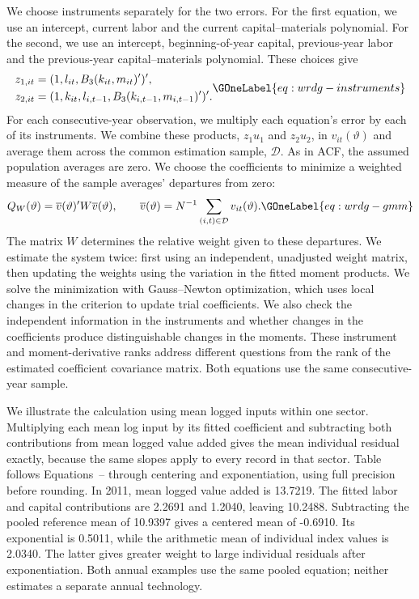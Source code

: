 We choose instruments separately for the two errors. For the first equation, we use an intercept, current labor and the current capital--materials polynomial. For the second, we use an intercept, beginning-of-year capital, previous-year labor and the previous-year capital--materials polynomial. These choices give
\begin{equation}
\begin{aligned}
z_{1,it}&=(1,l_{it},B_3(k_{it},m_{it})')',\\
z_{2,it}&=(1,k_{it},l_{i,t-1},B_3(k_{i,t-1},m_{i,t-1})')'.
\end{aligned}
\GOneLabel{eq:wrdg-instruments}
\end{equation}
For each consecutive-year observation, we multiply each equation's error by each of its instruments. We combine these products, $z_1u_1$ and $z_2u_2$, in $v_{it}(\vartheta)$ and average them across the common estimation sample, $\mathcal D$. As in ACF, the assumed population averages are zero. We choose the coefficients to minimize a weighted measure of the sample averages' departures from zero:
\begin{equation}
Q_W(\vartheta)=\overline v(\vartheta)'W\overline v(\vartheta),\qquad
\overline v(\vartheta)=N^{-1}\sum_{(i,t)\in\mathcal D}v_{it}(\vartheta).
\GOneLabel{eq:wrdg-gmm}
\end{equation}
The matrix $W$ determines the relative weight given to these departures. We estimate the system twice: first using an independent, unadjusted weight matrix, then updating the weights using the variation in the fitted moment products. We solve the minimization with Gauss--Newton optimization, which uses local changes in the criterion to update trial coefficients. We also check the independent information in the instruments and whether changes in the coefficients produce distinguishable changes in the moments. These instrument and moment-derivative ranks address different questions from the rank of the estimated coefficient covariance matrix. Both equations use the same consecutive-year sample.

We illustrate the calculation using mean logged inputs within one sector. Multiplying each mean log input by its fitted coefficient and subtracting both contributions from mean logged value added gives the mean individual residual exactly, because the same slopes apply to every record in that sector. Table~ follows Equations~-- through centering and exponentiation, using full precision before rounding.
In 2011, mean logged value added is 13.7219. The fitted labor and capital contributions are 2.2691 and 1.2040, leaving 10.2488. Subtracting the pooled reference mean of 10.9397 gives a centered mean of -0.6910. Its exponential is 0.5011, while the arithmetic mean of individual index values is 2.0340. The latter gives greater weight to large individual residuals after exponentiation. Both annual examples use the same pooled equation; neither estimates a separate annual technology.


